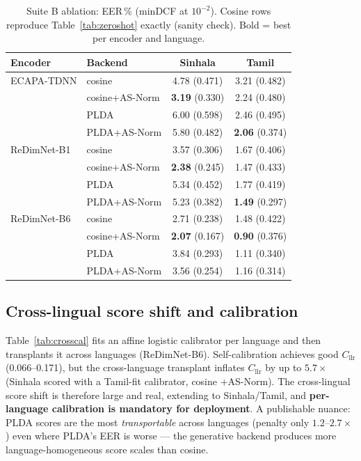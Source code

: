 \begin{table}[t]
\centering
\caption{Suite B ablation: EER\,\% (minDCF at $10^{-2}$).
Cosine rows reproduce Table~\ref{tab:zeroshot} exactly (sanity
check). Bold = best per encoder and language.}
\label{tab:backend}
\begin{tabular}{llcc}
\toprule
\textbf{Encoder} & \textbf{Backend} & \textbf{Sinhala} & \textbf{Tamil} \\
\midrule
ECAPA-TDNN & cosine          & 4.78 (0.471) & 3.21 (0.482) \\
           & cosine+AS-Norm  & \textbf{3.19} (0.330) & 2.24 (0.480) \\
           & PLDA            & 6.00 (0.598) & 2.46 (0.495) \\
           & PLDA+AS-Norm    & 5.80 (0.482) & \textbf{2.06} (0.374) \\
\midrule
ReDimNet-B1 & cosine         & 3.57 (0.306) & 1.67 (0.406) \\
            & cosine+AS-Norm & \textbf{2.38} (0.245) & 1.47 (0.433) \\
            & PLDA           & 5.34 (0.452) & 1.77 (0.419) \\
            & PLDA+AS-Norm   & 5.23 (0.382) & \textbf{1.49} (0.297) \\
\midrule
ReDimNet-B6 & cosine         & 2.71 (0.238) & 1.48 (0.422) \\
            & cosine+AS-Norm & \textbf{2.07} (0.167) & \textbf{0.90} (0.376) \\
            & PLDA           & 3.84 (0.293) & 1.11 (0.340) \\
            & PLDA+AS-Norm   & 3.56 (0.254) & 1.16 (0.314) \\
\bottomrule
\end{tabular}
\end{table}

\subsection{Cross-lingual score shift and calibration}
\label{sec:calibration-results}

Table~\ref{tab:crosscal} fits an affine logistic calibrator per
language and then transplants it across languages (ReDimNet-B6).
Self-calibration achieves good $C_{\mathrm{llr}}$ (0.066--0.171), but
the cross-language transplant inflates $C_{\mathrm{llr}}$ by up to
$5.7\times$ (Sinhala scored with a Tamil-fit calibrator, cosine
{+}AS-Norm). The cross-lingual score shift is therefore large and
real, extending \cite{thienpondt2022calibration} to Sinhala/Tamil,
and \textbf{per-language calibration is mandatory for deployment}.
A publishable nuance: PLDA scores are the most \emph{transportable}
across languages (penalty only $1.2$--$2.7\times$) even where PLDA's
EER is worse — the generative backend produces more
language-homogeneous score scales than cosine.

